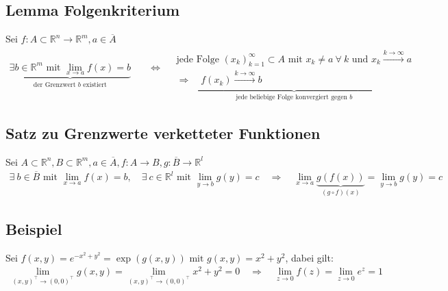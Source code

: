 \documentclass[11pt,a4paper]{book}
\newcommand {\R}	{\mathbb{R}}
\newcommand {\Rn}	{\mathbb{R}^n}
\newcommand {\Rm}	{\mathbb{R}^m}
\newcommand{\1}    	{\mathbbm{1}}
\newcommand{\mitt}	{\textrm{ mit }}
\begin{document}
\subsection{Lemma Folgenkriterium}
Sei \(f : A \subset \Rn \rightarrow \Rm, a \in \overline{A} \)
\begin{align*}
	\underbrace{\exists b \in \Rm \mitt \lim_{x \rightarrow a} f(x) = b}_{\textrm{der Grenzwert } b \textrm{ existiert}} \quad &\Leftrightarrow \quad
	\underbrace{
		\begin{array}{l}
			\textrm{jede Folge } (x_k)_{k=1}^\infty \subset A \mitt x_k \neq a ~ \forall~ k \textrm{ und } x_k \stackrel{k \rightarrow \infty}{\rightarrow} a \\
			\Rightarrow  \quad f(x_k) \stackrel{k \rightarrow \infty}{\rightarrow} b
		\end{array}
	}_{\textrm{jede beliebige Folge konvergiert gegen } b}
\end{align*}

\subsection{Satz zu Grenzwerte verketteter Funktionen}
Sei \(A \subset \Rn, B \subset \Rm, a \in \overline{A}, f: A \rightarrow B, g: \overline{B} \rightarrow \R^l \)
\begin{align*}
	\exists~ b \in \overline{B} \mitt \lim_{x \rightarrow a} f(x) = b, \quad
	\exists~ c \in \R^l \mitt \lim_{y \rightarrow b} g(y) = c \quad \Rightarrow \quad
	\lim_{x \rightarrow a} \underbrace{g\left(f(x)\right)}_{(g \circ f)(x)} = \lim_{y \rightarrow b} g(y) = c
\end{align*}

\subsection{Beispiel}
Sei \(f(x,y) = e^{-x^2 + y^2} = \exp\left( g(x,y) \right) \mitt g(x,y) = x^2 + y^2\), dabei gilt:
\begin{align*}
	\lim_{(x,y)^\top \rightarrow (0,0)^\top} g(x,y) = \lim_{(x,y)^\top \rightarrow (0,0)^\top} x^2 + y^2 = 0
	\quad \Rightarrow \quad \lim_{z \rightarrow 0} f(z) = \lim_{z \rightarrow 0} e^z = 1 \\
\end{align*}
\end{document}
